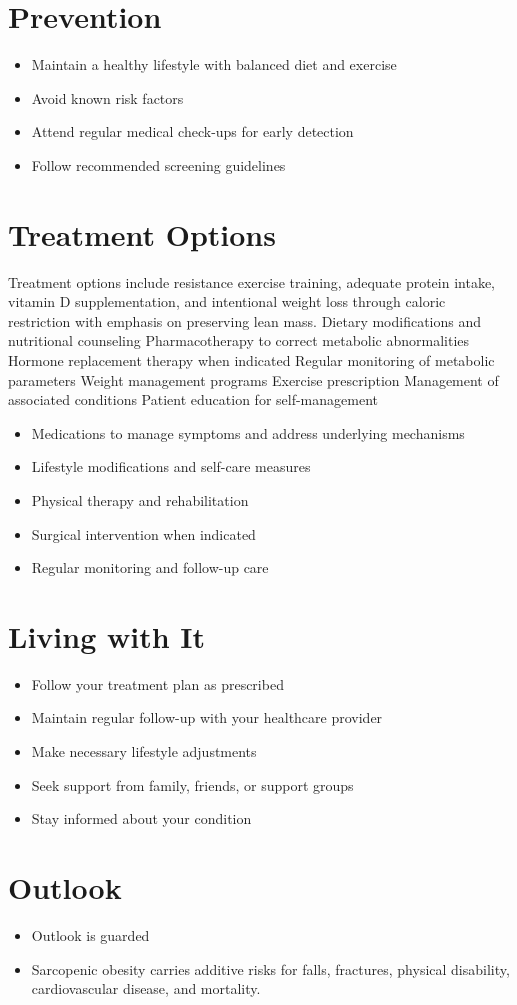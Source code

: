 \section{Prevention}
\begin{itemize}[noitemsep]
  \item Maintain a healthy lifestyle with balanced diet and exercise
  \item Avoid known risk factors
  \item Attend regular medical check-ups for early detection
  \item Follow recommended screening guidelines
\end{itemize}
\section{Treatment Options}
Treatment options include resistance exercise training, adequate protein intake, vitamin D supplementation, and intentional weight loss through caloric restriction with emphasis on preserving lean mass. Dietary modifications and nutritional counseling Pharmacotherapy to correct metabolic abnormalities Hormone replacement therapy when indicated Regular monitoring of metabolic parameters Weight management programs Exercise prescription Management of associated conditions Patient education for self-management

\begin{itemize}[noitemsep]
  \item Medications to manage symptoms and address underlying mechanisms
  \item Lifestyle modifications and self-care measures
  \item Physical therapy and rehabilitation
  \item Surgical intervention when indicated
  \item Regular monitoring and follow-up care
\end{itemize}
\section{Living with It}
\begin{itemize}[noitemsep]
  \item Follow your treatment plan as prescribed
  \item Maintain regular follow-up with your healthcare provider
  \item Make necessary lifestyle adjustments
  \item Seek support from family, friends, or support groups
  \item Stay informed about your condition
\end{itemize}
\section{Outlook}
\begin{itemize}[noitemsep]
  \item Outlook is guarded
  \item Sarcopenic obesity carries additive risks for falls, fractures, physical disability, cardiovascular disease, and mortality.
\end{itemize}
